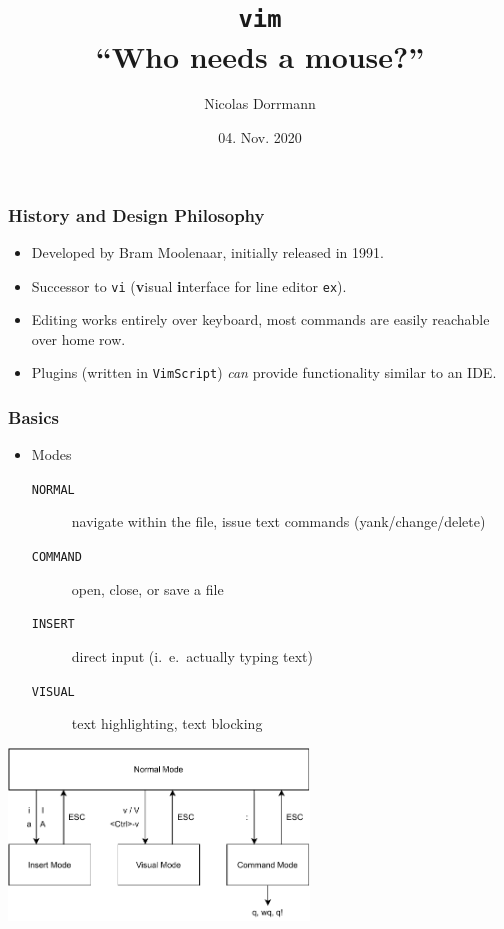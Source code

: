 \documentclass{beamer}
\title{\Huge\texttt{vim} \\ \normalsize ``Who needs a mouse?''}
\author{Nicolas Dorrmann}
\date{04. Nov. 2020}
\begin{document}
\frame{\titlepage}

\begin{frame}
    \frametitle{History and Design Philosophy}
    \begin{itemize}
        \item Developed by Bram Moolenaar, initially released in 1991.
        \item Successor to \texttt{vi} (\textbf{v}isual \textbf{i}nterface for line editor \texttt{ex}).
        \item Editing works entirely over keyboard, most commands are easily reachable over home row.
        \item Plugins (written in \texttt{VimScript}) \textit{can} provide functionality similar to an IDE.
    \end{itemize}
\end{frame}
\begin{frame}
    \frametitle{Basics}
    \begin{itemize}
        \item Modes
            \begin{description}
                \item [\texttt{NORMAL}]  navigate within the file, issue text commands (yank/change/delete)
                \item [\texttt{COMMAND}] open, close, or save a file
                \item [\texttt{INSERT}]  direct input (i.\ e.\ actually typing text)
                \item [\texttt{VISUAL}]  text highlighting, text blocking
            \end{description}
    \end{itemize}
    \vspace{0.5cm}
    \begin{center}
        \includegraphics[width=0.6\textwidth]{graphics/vim_modes.pdf}
    \end{center}
\end{frame}
\end{document}
